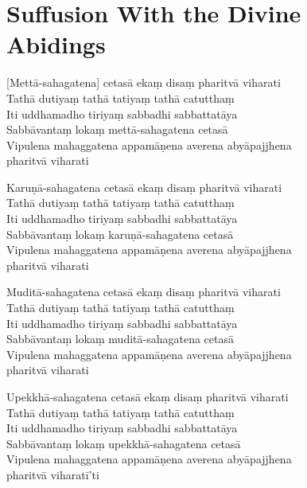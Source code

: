 
\section{Suffusion With the Divine Abidings}


\begin{leader}
\end{leader}

[Mettā-sahagatena] cetasā ekaṃ disaṃ pharitvā viharati\\
Tathā dutiyaṃ tathā tatiyaṃ tathā catutthaṃ\\
Iti uddhamadho tiriyaṃ sabbadhi sabbattatāya\\
Sabbāvantaṃ lokaṃ mettā-sahagatena cetasā\\
Vipulena mahaggatena appamāṇena averena abyāpajjhena\\
\vin pharitvā viharati

Karuṇā-sahagatena cetasā ekaṃ disaṃ pharitvā viharati\\
Tathā dutiyaṃ tathā tatiyaṃ tathā catutthaṃ\\
Iti uddhamadho tiriyaṃ sabbadhi sabbattatāya\\
Sabbāvantaṃ lokaṃ karuṇā-sahagatena cetasā\\
Vipulena mahaggatena appamāṇena averena abyāpajjhena\\
\vin pharitvā viharati

Muditā-sahagatena cetasā ekaṃ disaṃ pharitvā viharati\\
Tathā dutiyaṃ tathā tatiyaṃ tathā catutthaṃ\\
Iti uddhamadho tiriyaṃ sabbadhi sabbattatāya\\
Sabbāvantaṃ lokaṃ muditā-sahagatena cetasā\\
Vipulena mahaggatena appamāṇena averena abyāpajjhena\\
\vin pharitvā viharati

Upekkhā-sahagatena cetasā ekaṃ disaṃ pharitvā viharati\\
Tathā dutiyaṃ tathā tatiyaṃ tathā catutthaṃ\\
Iti uddhamadho tiriyaṃ sabbadhi sabbattatāya\\
Sabbāvantaṃ lokaṃ upekkhā-sahagatena cetasā\\
Vipulena mahaggatena appamāṇena averena abyāpajjhena\\
\vin pharitvā viharatī'ti

